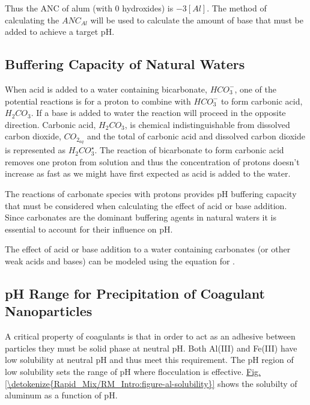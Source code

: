 \documentclass[letterpaper,10pt,english]{sphinxmanual}
\begin{document}
Thus the ANC of alum (with 0 hydroxides) is \(-3[Al]\). The method of calculating the \(ANC_{Al}\) will be used to calculate the amount of base that must be added to achieve a target pH.


\subsection{Buffering Capacity of Natural Waters}
\label{\detokenize{Rapid_Mix/RM_Intro:buffering-capacity-of-natural-waters}}\label{\detokenize{Rapid_Mix/RM_Intro:heading-buffering-capacity-of-natural-waters}}
When acid is added to a water containing bicarbonate, \(HCO_3^-\), one of the potential reactions is for a proton to combine with \(HCO_3^-\) to form carbonic acid, \({H_2}CO_3\). If a base is added to water the reaction will proceed in the opposite direction. Carbonic acid, \({H_2}CO_3\), is chemical indistinguishable from dissolved carbon dioxide, \(CO_{2_{aq}}\) and the total of carbonic acid and dissolved carbon dioxide is represented as \({H_2}CO_3^{\star}\). The reaction of bicarbonate to form carbonic acid removes one proton from solution and thus the concentration of protons doesn’t increase as fast as we might have first expected as acid is added to the water.

The reactions of carbonate species with protons provides pH buffering capacity that must be considered when calculating the effect of acid or base addition. Since carbonates are the dominant buffering agents in natural waters it is essential to account for their influence on pH.

The effect of acid or base addition to a water containing carbonates (or other weak acids and bases) can be modeled using the equation for {\hyperref[\detokenize{Rapid_Mix/RM_Derivations:heading-acid-neutralizing-capacity-anc-or-alkalinity}]{}}.


\subsection{pH Range for Precipitation of Coagulant Nanoparticles}
\label{\detokenize{Rapid_Mix/RM_Intro:ph-range-for-precipitation-of-coagulant-nanoparticles}}\label{\detokenize{Rapid_Mix/RM_Intro:heading-ph-range-for-precipitation-of-coagulant-nanoparticles}}
A critical property of coagulants is that in order to act as an adhesive between particles they must be solid phase at neutral pH. Both Al(III) and Fe(III) have low solubility at neutral pH and thus meet this requirement. The pH region of low solubility sets the range of pH where flocculation is effective. \hyperref[\detokenize{Rapid_Mix/RM_Intro:figure-al-solubility}]{Fig.\@ \ref{\detokenize{Rapid_Mix/RM_Intro:figure-al-solubility}}} shows the solubilty of aluminum as a function of pH.
\end{document}
